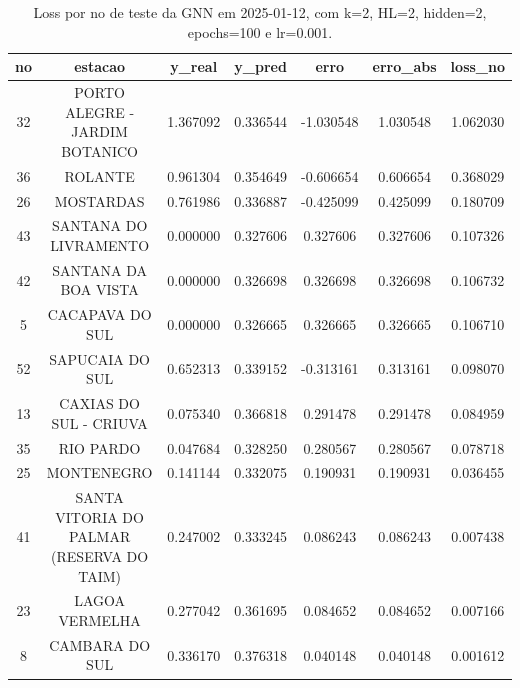 \begin{table}[h]
\centering
\caption{Loss por no de teste da GNN em 2025-01-12, com k=2, HL=2, hidden=2, epochs=100 e lr=0.001.}
\label{tab:gnn_loss_k2_hl2_h2_e100_d20250112}
\begin{tabular}{ccccccc}
\toprule
no & estacao & y\_real & y\_pred & erro & erro\_abs & loss\_no \\
\midrule
32 & PORTO ALEGRE - JARDIM BOTANICO & 1.367092 & 0.336544 & -1.030548 & 1.030548 & 1.062030 \\
36 & ROLANTE & 0.961304 & 0.354649 & -0.606654 & 0.606654 & 0.368029 \\
26 & MOSTARDAS & 0.761986 & 0.336887 & -0.425099 & 0.425099 & 0.180709 \\
43 & SANTANA DO LIVRAMENTO & 0.000000 & 0.327606 & 0.327606 & 0.327606 & 0.107326 \\
42 & SANTANA DA BOA VISTA & 0.000000 & 0.326698 & 0.326698 & 0.326698 & 0.106732 \\
5 & CACAPAVA DO SUL & 0.000000 & 0.326665 & 0.326665 & 0.326665 & 0.106710 \\
52 & SAPUCAIA DO SUL & 0.652313 & 0.339152 & -0.313161 & 0.313161 & 0.098070 \\
13 & CAXIAS DO SUL - CRIUVA & 0.075340 & 0.366818 & 0.291478 & 0.291478 & 0.084959 \\
35 & RIO PARDO & 0.047684 & 0.328250 & 0.280567 & 0.280567 & 0.078718 \\
25 & MONTENEGRO & 0.141144 & 0.332075 & 0.190931 & 0.190931 & 0.036455 \\
41 & SANTA VITORIA DO PALMAR (RESERVA DO TAIM) & 0.247002 & 0.333245 & 0.086243 & 0.086243 & 0.007438 \\
23 & LAGOA VERMELHA & 0.277042 & 0.361695 & 0.084652 & 0.084652 & 0.007166 \\
8 & CAMBARA DO SUL & 0.336170 & 0.376318 & 0.040148 & 0.040148 & 0.001612 \\
\bottomrule
\end{tabular}
\end{table}

